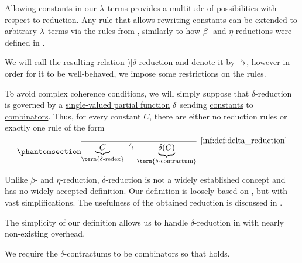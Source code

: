 \begin{definition}\label{def:delta_reduction}
  Allowing constants in our \( {\mathrm \lambda} \)-terms provides a multitude of possibilities with respect to reduction. Any rule that allows rewriting constants can be extended to arbitrary \( {\mathrm \lambda} \)-terms via the rules from , similarly to how \( \beta \)- and \( \eta \)-reductions were defined in .

  We will call the resulting relation \term[en=\( \delta \)-reduction (\cite[def. 15.3.1]{Barendregt1984LambdaCalculus})]{\( \delta \)-reduction} and denote it by \( {\dred} \), however in order for it to be well-behaved, we impose some restrictions on the rules.

  To avoid complex coherence conditions, we will simply suppose that \( \delta \)-reduction is governed by a \hyperref[def:set_valued_map/partial]{single-valued partial function} \( \op*{\delta} \) sending \hyperref[def:lambda_term/const]{constants} to \hyperref[def:lambda_combinator]{combinators}. Thus, for every constant \( C \), there are either no reduction rules or exactly one rule of the form
  \begin{equation*}\taglabel[\ensuremath{ \logic{Red}_{\delta_C} }]{inf:def:delta_reduction}
    \begin{prooftree}
      \infer0[\ref{inf:def:delta_reduction}]{ \underbrace{C}_{\T{\term{\( \delta \)-redex}}} \dred \underbrace{\op*{\delta}(C)}_{\T{\term{\( \delta \)-contractum}}} }.
    \end{prooftree}
  \end{equation*}
\end{definition}
\begin{comments}
  \item Unlike \( \beta \)- and \( \eta \)-reduction, \( \delta \)-reduction is not a widely established concept and has no widely accepted definition. Our definition is loosely based on , but with vast simplifications. The usefulness of the obtained reduction is discussed in .

  The simplicity of our definition allows us to handle \( \delta \)-reduction in  with nearly non-existing overhead.

  \item We require the \( \delta \)-contractums to be combinators so that  holds.
\end{comments}

